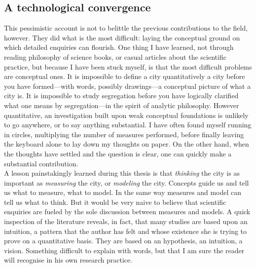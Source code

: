     \subsection{A technological convergence}
    \label{sub:a_technological_convergence} 


This pessimistic account is not to belittle the previous contributions to the
field, however. They did what is the most difficult: laying the conceptual
ground on which detailed enquiries can flourish. One thing I have learned, not
through reading philosophy of science books, or casual articles about the
scientific practice, but because I have been stuck myself, is that the most
difficult problems are conceptual ones. It is impossible to define a city
quantitatively a city before you have formed---with words, possibly drawings---a
conceptual picture of what a city is. It is impossible to study segregation
before you have logically clarified what one means by segregation---in the
spirit of analytic philosophy. However quantitative, an investigation built upon
weak conceptual foundations is unlikely to go anywhere, or to say anything
substantial. I have often found myself running in circles, multiplying the
number of measures performed, before finally leaving the keyboard alone to lay
down my thoughts on paper. On the other hand, when the thoughts have settled and
the question is clear, one can quickly make a substantial contribution.\\

A lesson painstakingly learned during this thesis is that \emph{thinking} the
city is as important as \emph{measuring} the city, or \emph{modeling} the city.
Concepts guide us and tell us what to measure, what to model. In the same way
measures and model can tell us what to think. But it would be very naive to
believe that scientific enquiries are fueled by the sole discussion between
measures and models. A quick inspection of the literature reveals, in fact, that
many studies are based upon an intuition, a pattern that the author has felt and
whose existence she is trying to prove on a quantitative basis. They are based
on an hypothesis, an intuition, a vision. Something difficult to explain with
words, but that I am sure the reader will recognise in his own research
practice.
